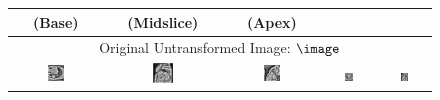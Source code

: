 \renewcommand{\captiontitle}{Orthogonal clinical views in canonical orientation}
\begin{figure}
\begin{center}

\setlength{\tabcolsep}{1pt}

\begin{tabular}{ccccc}

\toprule
\SA{} (Base) & \SA{} (Midslice) & \SA{} (Apex) & \HLA{} & \VLA{} \\
\midrule

\multicolumn{5}{c}{Original Untransformed Image: $\image$} \\

\includegraphics[width=0.19\textwidth]{./data/ohm/control/HCMNet_1100594/00_SAX/35_/im.png} &
\includegraphics[width=0.19\textwidth]{./data/ohm/control/HCMNet_1100823/00_SAX/33_/im.png} &
\includegraphics[width=0.19\textwidth]{./data/ohm/control/HCMNet_2600035/00_SAX/024_SA_CINE/im.png} &
\includegraphics[width=0.19\textwidth]{./data/ohm/control/HCMNet_1700012/01_HLA/00/im.png} &
\includegraphics[width=0.19\textwidth]{./data/ohm/control/HCMNet_2100096/02_VLA/00/im.png} \\


\end{tabular}
\end{center}
\end{figure}
